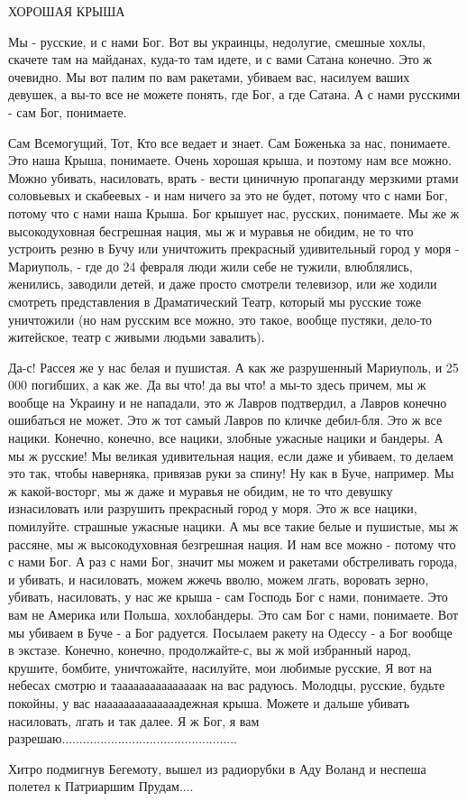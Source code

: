  
 
 
 
 


ХОРОШАЯ КРЫША

Мы - русские, и с нами Бог. Вот вы украинцы, недолугие, смешные хохлы, скачете
там на майданах, куда-то там идете, и с вами Сатана конечно. Это ж очевидно. Мы
вот палим по вам ракетами, убиваем вас, насилуем ваших девушек, а вы-то все не
можете понять, где Бог, а где Сатана.  А с нами русскими - сам Бог, понимаете.

Сам Всемогущий, Тот, Кто все ведает и знает. Сам Боженька за нас, понимаете.
Это наша Крыша, понимаете.  Очень хорошая крыша, и поэтому нам все можно. Можно
убивать, насиловать, врать - вести циничную пропаганду мерзкими ртами
соловьевых и скабеевых - и нам ничего за это не будет, потому что с нами Бог,
потому что с нами наша Крыша. Бог крышует нас, русских, понимаете. Мы же ж
высокодуховная бесгрешная нация, мы ж и муравья не обидим, не то что устроить
резню в Бучу или уничтожить прекрасный удивительный город у моря - Мариуполь, -
где до 24 февраля люди жили себе не тужили, влюблялись, женились, заводили
детей, и даже просто смотрели телевизор, или же ходили смотреть представления в
Драматический Театр, который мы русские тоже уничтожили (но нам русским все
можно, это такое, вообще пустяки, дело-то житейское, театр с живыми людьми завалить).

Да-с! Рассея же у нас белая и пушистая. А как же разрушенный Мариуполь, и 25
000 погибших, а как же. Да вы что! да вы что! а мы-то здесь причем, мы ж вообще
на Украину и не нападали, это ж Лавров подтвердил, а Лавров конечно ошибаться
не может. Это ж тот самый Лавров по кличке дебил-бля.  Это ж все нацики.
Конечно, конечно, все нацики, злобные ужасные нацики и бандеры. А мы ж русские!
Мы великая удивительная нация, если даже и убиваем, то делаем это так, чтобы
наверняка, привязав руки за спину!  Ну как в Буче, например.  Мы ж
какой-восторг, мы ж даже и муравья не обидим, не то что девушку изнасиловать
или разрушить прекрасный город у моря. Это ж все нацики, помилуйте. страшные
ужасные нацики. А мы все такие белые и пушистые, мы ж рассяне, мы ж
высокодуховная безгрешная нация. И нам все можно - потому что с нами Бог. А раз
с нами Бог, значит мы можем и ракетами обстреливать города, и убивать, и
насиловать, можем жжечь вволю, можем лгать, воровать зерно, убивать,
насиловать, у нас же крыша - сам Господь Бог с нами, понимаете. Это вам не
Америка или Польша, хохлобандеры. Это сам Бог с нами, понимаете. Вот мы убиваем
в Буче - а Бог радуется. Посылаем ракету на Одессу - а Бог вообще в экстазе.
Конечно, конечно, продолжайте-с, вы ж мой избранный народ, крушите, бомбите,
уничтожайте, насилуйте, мои любимые русские, Я вот на небесах смотрю и
тааааааааааааааак на вас радуюсь. Молодцы, русские, будьте покойны, у вас
наааааааааааааадежная крыша. Можете и дальше убивать насиловать, лгать и так
далее. Я ж Бог, я вам
разрешаю.................................................. 

Хитро подмигнув Бегемоту, вышел из радиорубки в Аду Воланд и неспеша полетел к Патриаршим
Прудам....
